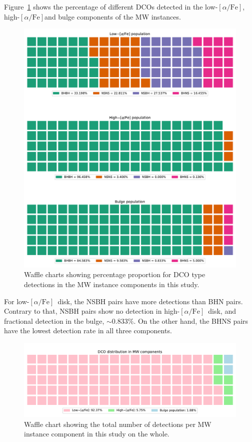 \documentclass[journal, twocolumn]{IEEEtran}
\newcommand{\lowalpha}{low-$[\alpha/\text{Fe}]$}
\newcommand{\highalpha}{high-$[\alpha/\text{Fe}]$}
\begin{document}
    Figure~\ref{fig:dcotypemwcomponentdistributioncropped} shows the percentage of different DCOs detected in the \lowalpha, \highalpha and bulge components of the MW instances.

    \begin{figure}[!h]%
        \centering
        \includegraphics[width=\columnwidth]{analysis_data/main_analysis_folder/dco_type_MW_component_distribution_cropped}
        \caption{Waffle charts showing percentage proportion for DCO type detections in the MW instance components in this study.}
        \label{fig:dcotypemwcomponentdistributioncropped}
    \end{figure}%
    For \lowalpha\ disk, the NSBH pairs have more detections than BHN pairs.
    Contrary to that, NSBH pairs show no detection in \highalpha\ disk, and fractional detection in the bulge, $\sim0.833\%$.
    On the other hand, the BHNS pairs have the lowest detection rate in all three components.

    \begin{figure}[!h]%
        \centering
        \includegraphics[width=\columnwidth]{analysis_data/main_analysis_folder/dco_type_MW_distribution}
        \caption{Waffle chart showing the total number of detections per MW instance component in this study on the whole.}
        \label{fig:dcotypemwdistribution}
    \end{figure}%
\end{document}
